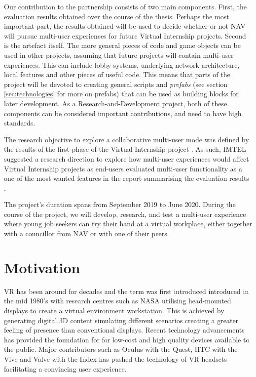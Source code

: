 
Our contribution to the partnership consists of two main components. First, the evaluation results obtained over the course of the thesis. Perhaps the most important part, the results obtained will be used to decide whether or not NAV will pursue multi-user experiences for future Virtual Internship projects. Second is the artefact itself. The more general pieces of code and game objects can be used in other projects, assuming that future projects will contain multi-user experiences. This can include lobby systems, underlying network architecture, local features and other pieces of useful code. This means that parts of the project will be devoted to creating general scripts and \textit{prefabs} (see section \ref{sec:technologies} for more on prefabs) that can be used as building blocks for later development. As a Research-and-Development project, both of these components can be considered important contributions, and need to have high standards.


The research objective to explore a collaborative multi-user mode was defined by the results of the first phase of the Virtual Internship project \cite{NavVRrapport}. As such, IMTEL suggested a research direction to explore how multi-user experiences would affect Virtual Internship projects as end-users evaluated multi-user functionality as a one of the most wanted features in the report summarising the evaluation results \cite{NavVRrapport}.    




The project's duration spans from September 2019 to June 2020. During the course of the project, we will develop, research, and test a multi-user experience where young job seekers can try their hand at a virtual workplace, either together with a councillor from NAV or with one of their peers.

\section{Motivation}
VR has been around for decades and the term was first introduced introduced in the mid 1980's \cite{historyVR} with research centres such as NASA utilising head-mounted displays to create a virtual environment workstation. This is achieved by generating digital 3D content simulating different scenarios creating a greater feeling of presence than conventional displays. Recent technology advancements has provided the foundation for for low-cost and high quality devices available to the public. Major contributors such as Oculus with the Quest, HTC with the Vive and Valve with the Index has pushed the technology of VR headsets facilitating a convincing user experience.  

